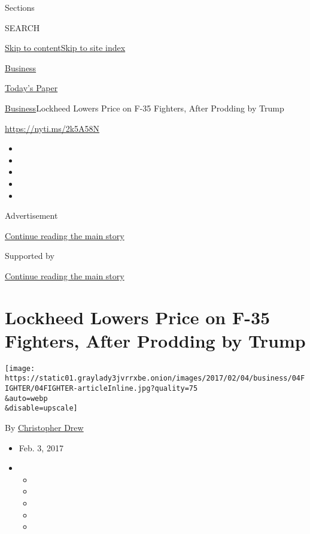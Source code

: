 Sections

SEARCH

\protect\hyperlink{site-content}{Skip to
content}\protect\hyperlink{site-index}{Skip to site index}

\href{https://www.nytimes3xbfgragh.onion/section/business}{Business}

\href{https://myaccount.nytimes3xbfgragh.onion/auth/login?response_type=cookie\&client_id=vi}{}

\href{https://www.nytimes3xbfgragh.onion/section/todayspaper}{Today's
Paper}

\href{/section/business}{Business}\textbar{}Lockheed Lowers Price on
F-35 Fighters, After Prodding by Trump

\url{https://nyti.ms/2k5A58N}

\begin{itemize}
\item
\item
\item
\item
\item
\end{itemize}

Advertisement

\protect\hyperlink{after-top}{Continue reading the main story}

Supported by

\protect\hyperlink{after-sponsor}{Continue reading the main story}

\hypertarget{lockheed-lowers-price-on-f-35-fighters-after-prodding-by-trump}{%
\section{Lockheed Lowers Price on F-35 Fighters, After Prodding by
Trump}\label{lockheed-lowers-price-on-f-35-fighters-after-prodding-by-trump}}

\texttt{[image: https://static01.graylady3jvrrxbe.onion/images/2017/02/04/business/04FIGHTER/04FIGHTER-articleInline.jpg?quality=75\\\&auto=webp\\\&disable=upscale]}

By
\href{http://www.nytimes3xbfgragh.onion/by/christopher-drew}{Christopher
Drew}

\begin{itemize}
\item
  Feb. 3, 2017
\item
  \begin{itemize}
  \item
  \item
  \item
  \item
  \item
  \end{itemize}
\end{itemize}

